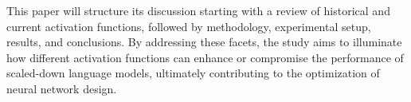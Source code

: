 This paper will structure its discussion starting with a review of historical and current activation functions, followed by methodology, experimental setup, results, and conclusions. By addressing these facets, the study aims to illuminate how different activation functions can enhance or compromise the performance of scaled-down language models, ultimately contributing to the optimization of neural network design.